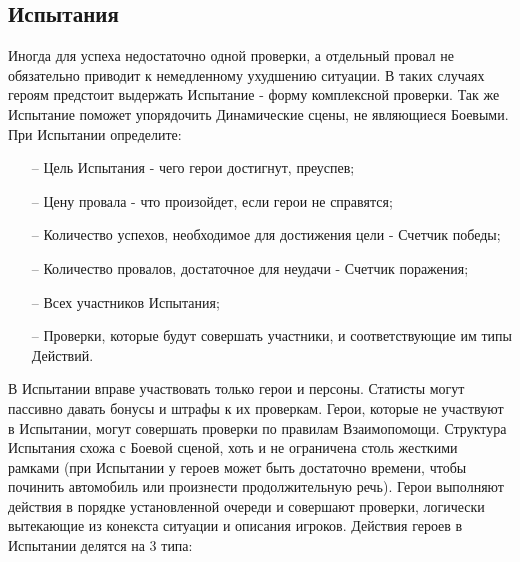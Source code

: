 \subsection{Испытания}
Иногда для успеха недостаточно одной проверки, а отдельный провал не обязательно приводит к немедленному ухудшению ситуации. В таких случаях героям предстоит выдержать Испытание - форму комплексной проверки. Так же Испытание поможет упорядочить Динамические сцены, не являющиеся Боевыми.
\newline При Испытании определите:
\begin{itemize}
\item[--]Цель Испытания - чего герои достигнут, преуспев;
\item[--]Цену провала - что произойдет, если герои не справятся;
\item[--]Количество успехов, необходимое для достижения цели - Счетчик победы;
\item[--]Количество провалов, достаточное для неудачи - Счетчик поражения;
\item[--]Всех участников Испытания;
\item[--]Проверки, которые будут совершать участники, и соответствующие им типы Действий.
\end{itemize}
В Испытании вправе участвовать только герои и персоны. Статисты могут пассивно давать бонусы и штрафы к их проверкам. Герои, которые не участвуют в Испытании, могут совершать проверки по правилам Взаимопомощи.
\newline Структура Испытания схожа с Боевой сценой, хоть и не ограничена столь жесткими рамками (при Испытании у героев может быть достаточно времени, чтобы починить автомобиль или произнести продолжительную речь). Герои выполняют действия в порядке установленной очереди и совершают проверки, логически вытекающие из конекста ситуации и описания игроков.
\newline Действия героев в Испытании делятся на 3 типа:
